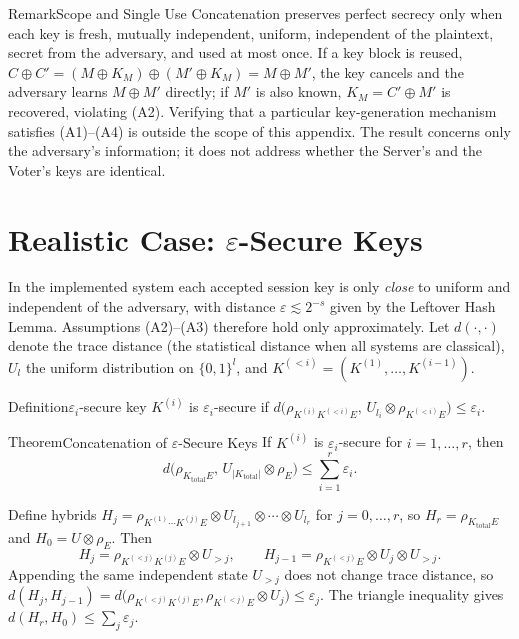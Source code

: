 \begin{statementB}{Remark}{Scope and Single Use}
Concatenation preserves perfect secrecy only when each key is fresh, mutually independent, uniform, independent of the plaintext, secret from the adversary, and used at most once. If a key block is reused, $C\oplus C'=(M\oplus K_M)\oplus(M'\oplus K_M)=M\oplus M'$, the key cancels and the adversary learns $M\oplus M'$ directly; if $M'$ is also known, $K_M=C'\oplus M'$ is recovered, violating (A2). Verifying that a particular key-generation mechanism satisfies (A1)--(A4) is outside the scope of this appendix. The result concerns only the adversary's information; it does not address whether the Server's and the Voter's keys are identical.
\end{statementB}

\section{Realistic Case: \texorpdfstring{$\varepsilon$}{epsilon}-Secure Keys}
\label{sec:concat-eps}

In the implemented system each accepted session key is only \emph{close} to uniform and independent of the adversary, with distance $\varepsilon\lesssim 2^{-s}$ given by the Leftover Hash Lemma. Assumptions (A2)--(A3) therefore hold only approximately. Let $d(\cdot,\cdot)$ denote the trace distance (the statistical distance when all systems are classical), $U_l$ the uniform distribution on $\{0,1\}^l$, and $K^{(<i)}=(K^{(1)},\ldots,K^{(i-1)})$.

\begin{statementB}{Definition}{$\varepsilon_i$-secure key}
$K^{(i)}$ is $\varepsilon_i$-secure if $d\bigl(\rho_{K^{(i)}K^{(<i)}E},\,U_{l_i}\otimes\rho_{K^{(<i)}E}\bigr)\le\varepsilon_i$.
\end{statementB}

\begin{statementB}{Theorem}{Concatenation of $\varepsilon$-Secure Keys}\label{thm:concat-eps}
If $K^{(i)}$ is $\varepsilon_i$-secure for $i=1,\ldots,r$, then
\[
d\bigl(\rho_{K_{\mathrm{total}}E},\,U_{|K_{\mathrm{total}}|}\otimes\rho_E\bigr)\le\sum_{i=1}^{r}\varepsilon_i .
\]
\end{statementB}
\begin{proofB}
Define hybrids $H_j=\rho_{K^{(1)}\cdots K^{(j)}E}\otimes U_{l_{j+1}}\otimes\cdots\otimes U_{l_r}$ for $j=0,\ldots,r$, so $H_r=\rho_{K_{\mathrm{total}}E}$ and $H_0=U\otimes\rho_E$. Then
\[
H_j=\rho_{K^{(<j)}K^{(j)}E}\otimes U_{>j},\qquad
H_{j-1}=\rho_{K^{(<j)}E}\otimes U_j\otimes U_{>j}.
\]
Appending the same independent state $U_{>j}$ does not change trace distance, so $d(H_j,H_{j-1})=d\bigl(\rho_{K^{(<j)}K^{(j)}E},\rho_{K^{(<j)}E}\otimes U_j\bigr)\le\varepsilon_j$. The triangle inequality gives $d(H_r,H_0)\le\sum_j\varepsilon_j$.
\end{proofB}


